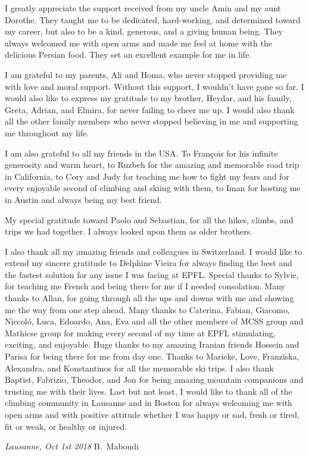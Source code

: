 I greatly appreciate the support received from my uncle Amin and my aunt Dorothe. They taught me to be dedicated, hard-working, and determined toward my career, but also to be a kind, generous, and a giving human being. They always welcomed me with open arms and made me feel at home with the delicious Persian food. They set an excellent example for me in life.


I am grateful to my parents, Ali and Homa, who never stopped providing me with love and moral support. Without this support, I wouldn't have gone so far. I would also like to express my gratitude to my brother, Heydar, and his family, Greta, Adrian, and Elmira, for never failing to cheer me up. I would also thank all the other family members who never stopped believing in me and supporting me throughout my life.


I am also grateful to all my friends in the USA. To Fran\c{c}ois for his infinite generosity and warm heart, to Ruzbeh for the amazing and memorable road trip in California, to Cory and Judy for teaching me how to fight my fears and for every enjoyable second of climbing and skiing with them, to Iman for hosting me in Austin and always being my best friend.


My special gratitude toward Paolo and Sebastian, for all the hikes, climbs, and trips we had together. I always looked upon them as older brothers.


I also thank all my amazing friends and colleagues in Switzerland.  I would like to extend my sincere gratitude to Delphine Vieira for always finding the best and the fastest solution for any issue I was facing at EPFL. Special thanks to Sylvie, for teaching me French and being there for me if I needed consolation. Many thanks to Allan, for going through all the ups and downs with me and showing me the way from one step ahead. Many thanks to Caterina, Fabian, Giacomo, Niccol\'o, Luca, Edoardo, Ana, Eva and all the other members of MCSS group and Mathicse group for making every second of my time at EPFL stimulating, exciting, and enjoyable. Huge thanks to my amazing Iranian friends Hossein and Parisa for being there for me from day one. Thanks to Marieke, Love, Franziska, Alexandra, and Konstantinos for all the memorable ski trips. I also thank Baptist, Fabrizio, Theodor, and Jon for being amazing mountain companions and trusting me with their lives. Last but not least, I would like to thank all of the climbing community in Lausanne and in Boston for always welcoming me with open arms and with positive attitude whether I was happy or sad, fresh or tired, fit or weak, or healthy or injured.

\bigskip
 
\noindent\textit{Lausanne, Oct 1st 2018}
\hfill B.~Maboudi
